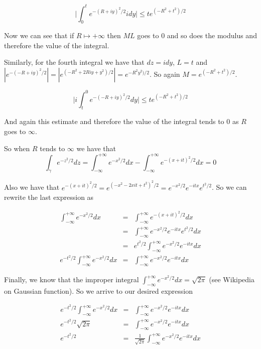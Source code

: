 \documentclass[letterpaper,twoside,11pt]{article}
\begin{document}
\begin{enumerate}[a)]
\begin{equation}
\bigg|\int_{0}^{t} e^{-(R+iy)^2/2}idy\bigg| \leq t e^{(-R^2+t^2)/2} \nonumber
\end{equation}

Now we can see that if $R \mapsto +\infty$ then $ML$ goes to 0 and so does the modulus and therefore the value of the integral.

Similarly, for the fourth integral we have that $dz=idy$, $L = t$ and $|e^{-(-R+iy)^2/2}|=|e^{(-R^2+2Riy+y^2)/2}|=e^{-R^2y^2)/2}$. So again $M=e^{(-R^2+t^2)/2}$.

\begin{equation}
\bigg|i\int_{t}^{0} e^{-(-R+iy)^2/2}dy\bigg| \leq t e^{(-R^2+t^2)/2} \nonumber
\end{equation}

And again this estimate and therefore the value of the integral tends to 0 as $R$ goes to $\infty$.

So when $R$ tends to $\infty$ we have that 
\begin{equation}
\int_{\gamma} e^{-z^2/2}dz=\int_{-\infty}^{+\infty} e^{-x^2/2}dx - \int_{-\infty}^{+\infty} e^{-(x+it)^2/2}dx\nonumber = 0
\end{equation}

Also we have that $e^{-(x+it)^2/2}=e^{(-x^2-2xit+t^2)^2/2}=e^{-x^2/2}e^{-itx}e^{t^2/2}$. So we can rewrite the last expression as

\begin{eqnarray}
\int_{-\infty}^{+\infty} e^{-x^2/2}dx &=& \int_{-\infty}^{+\infty} e^{-(x+it)^2/2}dx\nonumber
\\ &=& \int_{-\infty}^{+\infty} e^{-x^2/2}e^{-itx}e^{t^2/2}dx\nonumber
\\ &=& e^{t^2/2}\int_{-\infty}^{+\infty} e^{-x^2/2}e^{-itx}dx\nonumber
\\ e^{-t^2/2}\int_{-\infty}^{+\infty} e^{-x^2/2}dx&=&\int_{-\infty}^{+\infty} e^{-x^2/2}e^{-itx}dx\nonumber
\end{eqnarray}

Finally, we know that the improper integral $\int_{-\infty}^{+\infty} e^{-x^2/2}dx=\sqrt{2\pi}$ (see Wikipedia on Gaussian function). So we arrive to our desired expression

\begin{eqnarray}
e^{-t^2/2}\int_{-\infty}^{+\infty} e^{-x^2/2}dx&=&\int_{-\infty}^{+\infty} e^{-x^2/2}e^{-itx}dx\nonumber
\\ e^{-t^2/2}\sqrt{2\pi}&=&\int_{-\infty}^{+\infty} e^{-x^2/2}e^{-itx}dx\nonumber
\\ e^{-t^2/2}&=&\frac{1}{\sqrt{2\pi}}\int_{-\infty}^{+\infty} e^{-x^2/2}e^{-itx}dx\nonumber
\end{eqnarray}


\end{enumerate}
\end{document}
